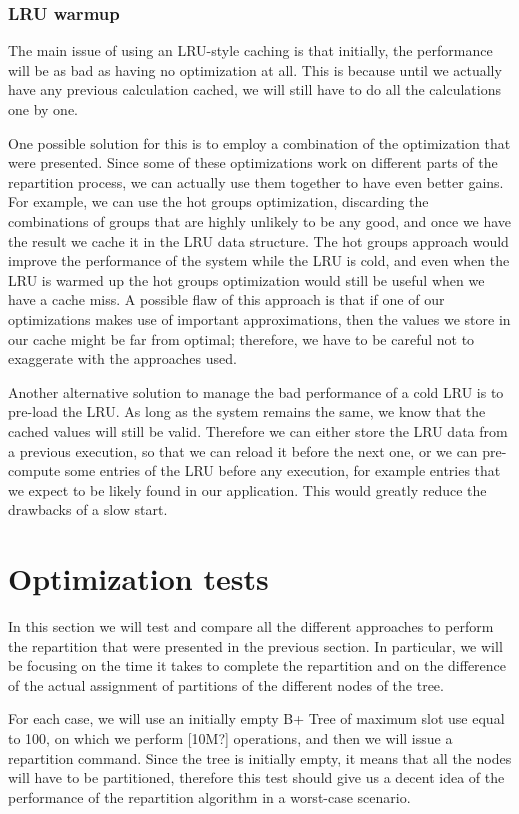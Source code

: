 \subsubsection{LRU warmup}\label{sec:warmup}
The main issue of using an LRU-style caching is that initially, the performance will be as bad as having no optimization at all. This is because until we actually have any previous calculation cached, we will still have to do all the calculations one by one. 

One possible solution for this is to employ a combination of the optimization that were presented. Since some of these optimizations work on different parts of the repartition process, we can actually use them together to have even better gains. For example, we can use the hot groups optimization, discarding the combinations of groups that are highly unlikely to be any good, and once we have the result we cache it in the LRU data structure. The hot groups approach would improve the performance of the system while the LRU is cold, and even when the LRU is warmed up the hot groups optimization would still be useful when we have a cache miss. A possible flaw of this approach is that if one of our optimizations makes use of important approximations, then the values we store in our cache might be far from optimal; therefore, we have to be careful not to exaggerate with the approaches used.

Another alternative solution to manage the bad performance of a cold LRU is to pre-load the LRU. As long as the system remains the same, we know that the cached values will still be valid. Therefore we can either store the LRU data from a previous execution, so that we can reload it before the next one, or we can pre-compute some entries of the LRU before any execution, for example entries that we expect to be likely found in our application. This would greatly reduce the drawbacks of a slow start.


\section{Optimization tests}\label{sec:optimization-tests}
In this section we will test and compare all the different approaches to perform the repartition that were presented in the previous section. 
In particular, we will be focusing on the time it takes to complete the repartition and on the difference of the actual assignment of partitions of the different nodes of the tree.

For each case, we will use an initially empty B+ Tree of maximum slot use equal to 100, on which we perform [10M?] operations, and then we will issue a repartition command. Since the tree is initially empty, it means that all the nodes will have to be partitioned, therefore this test should give us a decent idea of the performance of the repartition algorithm in a worst-case scenario. 

